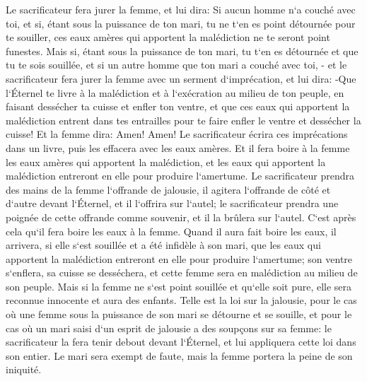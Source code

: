 \verse Le sacrificateur fera jurer la femme, et lui dira: Si aucun homme n`a couché avec toi, et si, étant sous la puissance de ton mari, tu ne t`en es point détournée pour te souiller, ces eaux amères qui apportent la malédiction ne te seront point funestes. 
\verse Mais si, étant sous la puissance de ton mari, tu t`en es détournée et que tu te sois souillée, et si un autre homme que ton mari a couché avec toi, - 
\verse et le sacrificateur fera jurer la femme avec un serment d`imprécation, et lui dira: -Que l`Éternel te livre à la malédiction et à l`exécration au milieu de ton peuple, en faisant dessécher ta cuisse et enfler ton ventre, 
\verse et que ces eaux qui apportent la malédiction entrent dans tes entrailles pour te faire enfler le ventre et dessécher la cuisse! Et la femme dira: Amen! Amen! 
\verse Le sacrificateur écrira ces imprécations dans un livre, puis les effacera avec les eaux amères. 
\verse Et il fera boire à la femme les eaux amères qui apportent la malédiction, et les eaux qui apportent la malédiction entreront en elle pour produire l`amertume. 
\verse Le sacrificateur prendra des mains de la femme l`offrande de jalousie, il agitera l`offrande de côté et d`autre devant l`Éternel, et il l`offrira sur l`autel; 
\verse le sacrificateur prendra une poignée de cette offrande comme souvenir, et il la brûlera sur l`autel. C`est après cela qu`il fera boire les eaux à la femme. 
\verse Quand il aura fait boire les eaux, il arrivera, si elle s`est souillée et a été infidèle à son mari, que les eaux qui apportent la malédiction entreront en elle pour produire l`amertume; son ventre s`enflera, sa cuisse se desséchera, et cette femme sera en malédiction au milieu de son peuple. 
\verse Mais si la femme ne s`est point souillée et qu`elle soit pure, elle sera reconnue innocente et aura des enfants. 
\verse Telle est la loi sur la jalousie, pour le cas où une femme sous la puissance de son mari se détourne et se souille, 
\verse et pour le cas où un mari saisi d`un esprit de jalousie a des soupçons sur sa femme: le sacrificateur la fera tenir debout devant l`Éternel, et lui appliquera cette loi dans son entier. 
\verse Le mari sera exempt de faute, mais la femme portera la peine de son iniquité. 

